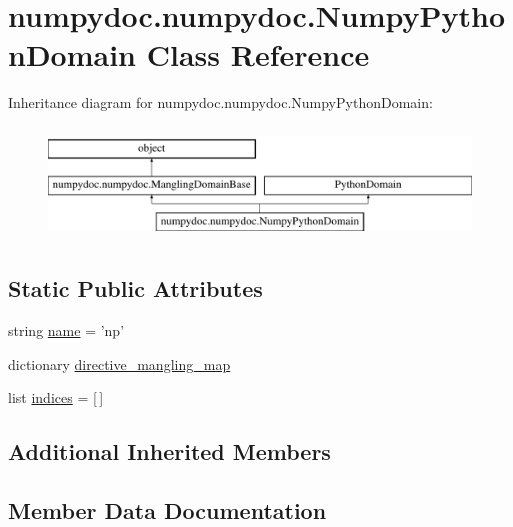 \hypertarget{classnumpydoc_1_1numpydoc_1_1NumpyPythonDomain}{}\section{numpydoc.\+numpydoc.\+Numpy\+Python\+Domain Class Reference}
\label{classnumpydoc_1_1numpydoc_1_1NumpyPythonDomain}
Inheritance diagram for numpydoc.\+numpydoc.\+Numpy\+Python\+Domain\+:\begin{figure}[H]
\begin{center}
\leavevmode
\includegraphics[height=3.000000cm]{classnumpydoc_1_1numpydoc_1_1NumpyPythonDomain}
\end{center}
\end{figure}
\subsection*{Static Public Attributes}
\begin{DoxyCompactItemize}
\item 
string \hyperlink{classnumpydoc_1_1numpydoc_1_1NumpyPythonDomain_ac79282fb89505f778362bf4d70dbfdce}{name} = 'np'
\item 
dictionary \hyperlink{classnumpydoc_1_1numpydoc_1_1NumpyPythonDomain_a6504d63f4e067e91b7aa856d427ea7c5}{directive\+\_\+mangling\+\_\+map}
\item 
list \hyperlink{classnumpydoc_1_1numpydoc_1_1NumpyPythonDomain_a41da9d63ee4a179d7e1333eee8168ec4}{indices} = \mbox{[}$\,$\mbox{]}
\end{DoxyCompactItemize}
\subsection*{Additional Inherited Members}


\subsection{Member Data Documentation}
\hypertarget{classnumpydoc_1_1numpydoc_1_1NumpyPythonDomain_a6504d63f4e067e91b7aa856d427ea7c5}{}
